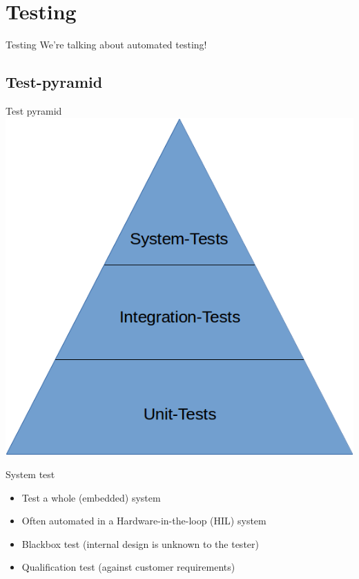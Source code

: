 \documentclass{beamer}
\begin{document}
\section{Testing}
\begin{frame}{Testing}
We're talking about automated testing!
\end{frame}

\subsection{Test-pyramid}
\begin{frame}{Test pyramid}
\includegraphics[scale=0.48]{img/TestPyramid.png}
\end{frame}

\begin{frame}{System test}
\begin{itemize}
  \item Test a whole (embedded) system
  \item Often automated in a Hardware-in-the-loop (HIL) system
  \item Blackbox test (internal design is unknown to the tester)
  \item Qualification test (against customer requirements)
\end{itemize}
\end{frame}
\end{document}
